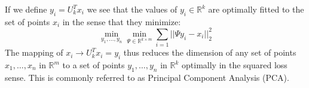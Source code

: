 \documentclass{article}
\newcommand{\R}{\mathbb R}
\begin{document}
If we define $y_i = U_{k}^{T}x_{i}$ we see that the values of $y_i \in \R^{k}$ are optimally fitted to the set of points $x_i$ in the 
sense that they minimize:
\[
\min_{y_1,\ldots,y_n } \min_{\Psi \in \R^{k \times m}}\sum_{i=1} ||\Psi y_i - x_{i}||_{2}^{2}
\] 
The mapping of $x_i \rightarrow  U_{k}^{T}x_i = y_i $ thus reduces the dimension of any set of points  $x_1,\ldots,x_n$ in $\R^{m}$ to 
a set of points $y_1,\ldots,y_n$ in $\R^{k}$ optimally in the squared loss sense. This is commonly referred to as Principal Component Analysis (PCA).
\end{document}

